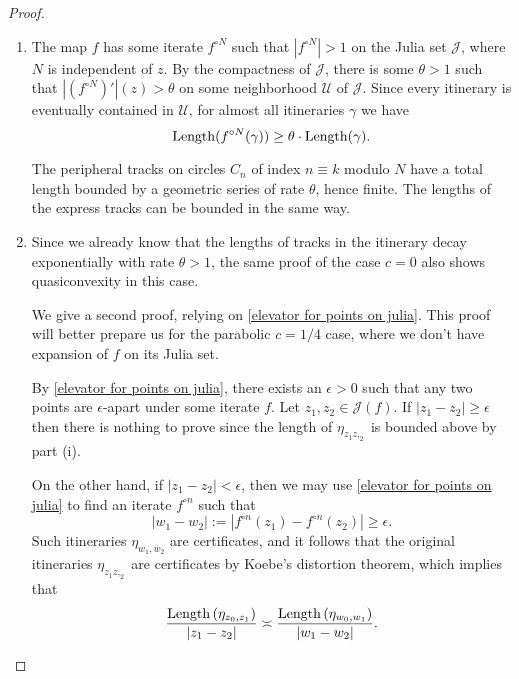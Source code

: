 \begin{proof} \leavevmode
\begin{enumerate}[label=\normalfont(\roman*)]
\item The map $f$ has some iterate $f^{\circ N}$ such that $|f^{\circ N}|>1$ on the Julia set $\mathcal{J}$, where $N$ is independent of $z$.
By the compactness of $\mathcal J$, there is some $\theta >1$ such that $\left|(f^{\circ N})'\right|(z)>\theta$ on some neighborhood $\mathcal{U}$ of $\mathcal{J}$.
Since every itinerary is eventually contained in $\mathcal{U}$, for almost all itineraries $\gamma$ we have 
\begin{equation*}
\operatorname{Length} ( f^{\circ N}(\gamma) ) \geq \theta \cdot \operatorname{Length}( \gamma). 
\end{equation*}

The peripheral tracks on circles $C_n$ of index $n \equiv k$ modulo $N$ have a total length bounded by a geometric series of rate $\theta$, hence finite. 
The lengths of the express tracks can be bounded in the same way. %

\item Since we already know that the lengths of tracks in the itinerary decay exponentially with rate $\theta>1$, the same proof of the case $c=0$ also shows quasiconvexity in this case.

We give a second proof, relying on \cref{elevator for points on julia}. This proof will better prepare us for the parabolic $c=1/4$ case, where we don't have expansion of $f$ on its Julia set.

By \cref{elevator for points on julia}, there exists an $\epsilon>0$ such that any two points are $\epsilon$-apart under some iterate $f$. 
Let $z_{1},z_{2}\in\mathcal{J}(f)$. If $\left|z_{1}-z_{2}\right|\geq\epsilon$ then there is nothing to
prove since the length of $\eta_{z_1z,_2}$ is bounded above by part (i).

\begin{comment}
Explicitly, if $\Length\left(\eta_{z}\right)\leq L$
for all $z\in\mathcal{J}$ then we take $A\geq\frac{2L}{\epsilon}$
and then automatically $\Length\left(\eta_{z_{1}}+\eta_{z_{2}}\right)\leq A\left|z_{1}-z_{2}\right|$.
\end{comment}

On the other hand, if $\left|z_{1}-z_{2}\right|<\epsilon$, then
we may use  \cref{elevator for points on julia} to find an iterate $f^{\circ n}$ such that 
\begin{equation}
	|w_1-w_2|:=\left|f^{\circ n}(z_{1})-f^{\circ n}(z_{2})\right|\geq\epsilon.
\end{equation}
Such itineraries $\eta_{w_1,w_2}$ are certificates, and it follows that the original itineraries $\eta_{z_1z,_2}$ are certificates by Koebe's distortion theorem, which implies that 
\begin{equation}
	\frac{\operatorname{Length}\left(\eta_{z_{0},z_{1}}\right)}{|z_1-z_2|}\asymp\frac{\operatorname{Length}\left(\eta_{w_0,w_1}\right)}{|w_1-w_2|}.
\end{equation}


\end{enumerate}
\end{proof}
